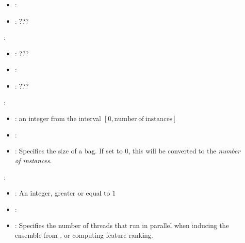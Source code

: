 \begin{itemize}
{\begin{itemize}
                \item \optionDefaultValue{}: 
                \item \optionDescrption{}: ???
           \end{itemize}
    \item {}:
           \begin{itemize}
                \item \optionPossibleValues{}: ???
                \item \optionDefaultValue{}: 
                \item \optionDescrption{}: ???
           \end{itemize}
    }
    \item {}:
           \begin{itemize}
                \item \optionPossibleValues{}: an integer from the interval $[0, \mathrm{number\ of\ instances}]$
                \item \optionDefaultValue{}: 
                \item \optionDescrption{}: Specifies the size of a bag. If set to $0$, this will be converted to the \emph{number of instances}.
           \end{itemize}
    \item {}:
           \begin{itemize}
                \item \optionPossibleValues{}: An integer, greater or equal to $1$
                \item \optionDefaultValue{}: 
                \item \optionDescrption{}: Specifies the number of threads that run in parallel when inducing the ensemble from ,
                or computing  feature ranking.
           \end{itemize}
\end{itemize}




